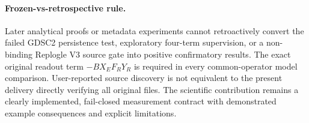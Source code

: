 \paragraph{Frozen-vs-retrospective rule.} Later analytical proofs or metadata experiments cannot retroactively convert the failed GDSC2 persistence test, exploratory four-term supervision, or a non-binding Replogle V3 source gate into positive confirmatory results. The exact original readout term $-BX_EF_RY_R$ is required in every common-operator model comparison. User-reported source discovery is not equivalent to the present delivery directly verifying all original files. The scientific contribution remains a clearly implemented, fail-closed measurement contract with demonstrated example consequences and explicit limitations.
